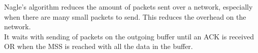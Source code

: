 Nagle's algorithm reduces the amount of packets sent over a network, especially when there are many small packets to send. This reduces the overhead on the network. \\It waits with sending of packets on the outgoing buffer until an ACK is received OR when the MSS is reached with all the data in the buffer.